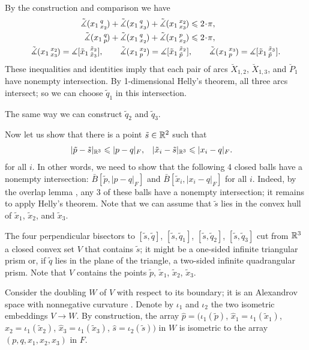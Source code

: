 \documentclass{article}
\begin{document}
By the construction and comparison we have 
\begin{align*}
\angk{x_1}{q}{x_2}+\angk{x_1}{q}{x_3}&+\angk{x_1}{x_2}{x_3}\le 2\cdot\pi,
\\
\angk{x_1}{q}{p}+\angk{x_1}{q}{x_2}&+\angk{x_1}{p}{x_2}\le 2\cdot\pi,
\\
\angk{x_1}{x_2}{x_3}=\measuredangle\hinge{\tilde x_1}{\tilde x_2}{\tilde x_3},
\qquad
\angk{x_1}{x_2}{p}&=\measuredangle\hinge{\tilde x_1}{\tilde x_2}{\tilde p},
\qquad
\angk{x_1}{x_3}{p}=\measuredangle\hinge{\tilde x_1}{\tilde x_3}{\tilde p}.
\end{align*}
These inequalities and identities imply that each pair of arcs $\breve{X}_{1,2}$, $\breve{X}_{1,3}$, and $\breve{P}_{1}$ have nonempty intersection.
By 1-dimensional Helly's theorem, all three arcs intersect;
so we can choose $\tilde q_1$ in this intersection.

The same way we can construct $\tilde q_2$ and $\tilde q_3$.

Now let us show that there is a point $\tilde s\in\mathbb{R}^2$ such that
\begin{align*}
|\tilde p-\tilde s|_{\mathbb{R}^3}&\leqslant|p-q|_F,
&
|\tilde x_i-\tilde s|_{\mathbb{R}^3}&\leqslant|x_i-q|_F.
\end{align*}
for all $i$.
In other words, we need to show that the following 4 closed balls have a nonempty intersection: 
$\bar B[\tilde p,|p-q|_F]$ and
$\bar B[\tilde x_i,|x_i-q|_F]$ for all $i$.
Indeed, by the overlap lemma \cite{alexander2019alexandrov}, any 3 of these balls have a nonempty intersection;
it remains to apply Helly's theorem.
Note that we can assume that $\tilde s$ lies in the convex hull of $\tilde x_1$, $\tilde x_2$, and $\tilde x_3$.

The four perpendicular bisectors to 
$[\tilde s, \tilde q]$, 
$[\tilde s, \tilde q_1]$, 
$[\tilde s, \tilde q_2]$, 
$[\tilde s, \tilde q_3]$ cut from $\mathbb{R}^3$ a closed convex set $V$ that contains $\tilde s$;
it might be a one-sided infinite triangular prism or, if $\tilde q$ lies in the plane of the triangle, a two-sided infinite quadrangular prism.
Note that $V$ contains the points $\tilde p$, $\tilde x_1$, $\tilde x_2$, $\tilde x_3$.

Consider the doubling $W$ of $V$ with respect to its boundary;
it is an Alexandrov space with nonnegative curvature \cite[5.2]{perelman:spaces2}.
Denote by $\iota_1$ and $\iota_2$ the two isometric embeddings $V\to W$.
By construction, the array $\hat p=(\iota_1(\tilde p)$, $\hat x_1=\iota_1(\tilde x_1)$, $\hat x_2=\iota_1(\tilde x_2)$, $\hat x_3=\iota_1(\tilde x_3)$,  $\hat s=\iota_2(\tilde s))$ in $W$ is isometric to the array $(p, q, x_1, x_2, x_3)$ in $F$.
\end{document}
